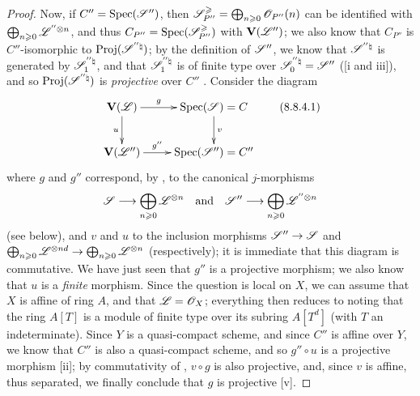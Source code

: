 \begin{proof}
Now, if $C''=\operatorname{Spec}(\mathscr{S}'')$, then $\mathscr{S}_{P''}^\geqslant=\bigoplus_{n\geqslant0}\mathscr{O}_{P''}(n)$ can be identified with $\bigoplus_{n\geqslant0}\mathscr{L}^{''\otimes n}$, and thus $C_{P''}=\operatorname{Spec}(\mathscr{S}_{P''}^\geqslant)$ with $\mathbf{V}(\mathscr{L}'')$;
we also know  that $C_{P''}$ is $C''$-isomorphic to $\operatorname{Proj}(\mathscr{S}^{''\natural})$;
by the definition of $\mathscr{S}''$, we know that $\mathscr{S}^{''\natural}$ is generated by $\mathscr{S}_1^{''\natural}$, and that $\mathscr{S}_1^{''\natural}$ is of finite type over $\mathscr{S}_0^{''\natural}=\mathscr{S}''$ ([i and iii]), and so $\operatorname{Proj}(\mathscr{S}^{''\natural})$ is \emph{projective} over $C''$ .
Consider the diagram
\[
\label{II.8.8.4.1}
  \xymatrix{
    \bb{V}(\sh{L})
      \ar[r]^-{g}
      \ar[d]_{u}
  & \Spec(\sh{S}) = C
      \ar[d]^{v}
  \\\bb{V}(\sh{L}'')
      \ar[r]^-{g''}
  & \Spec(\sh{S}'') = C''
  }
  \tag{8.8.4.1}
\]
where $g$ and $g''$ correspond, by , to the canonical $j$-morphisms
\[
  \sh{S}\to\bigoplus_{n\geq0}\sh{L}^{\otimes n}
  \quad\mbox{and}\quad
  \sh{S}''\to\bigoplus_{n\geq0}\sh{L}^{''\otimes n}
\]
 (see  below), and $v$ and $u$ to the inclusion morphisms $\sh{S}''\to\sh{S}$ and $\bigoplus_{n\geq0}\sh{L}^{\otimes nd}\to\bigoplus_{n\geq0}\sh{L}^{\otimes n}$ (respectively);
it is immediate  that this diagram is commutative.
We have just seen that $g''$ is a projective morphism;
we also know that $u$ is a \emph{finite} morphism.
Since the question is local on $X$, we can assume that $X$ is affine of ring $A$, and that $\mathscr{L}=\mathscr{O}_X$;
everything then reduces to noting that the ring $A[T]$ is a module of finite type over its subring $A[T^d]$ (with $T$ an indeterminate).
Since $Y$ is a quasi-compact scheme, and since $C''$ is affine over $Y$, we know that $C''$ is also a quasi-compact scheme,
and so $g''\circ u$ is a projective morphism [ii];
by commutativity of , $v\circ g$ is also projective, and, since $v$ is affine, thus separated, we finally conclude that $g$ is projective [v].
\end{proof}

